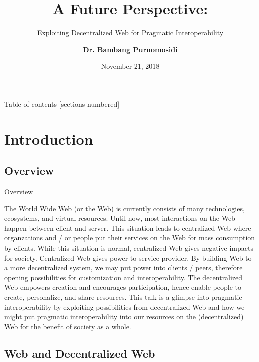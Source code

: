 \documentclass[10pt]{beamer}
\title{A Future Perspective:}
\subtitle{Exploiting Decentralized Web for Pragmatic Interoperability}
\date{November 21, 2018}
\author{\textbf{Dr. Bambang Purnomosidi}}
\institute{Informatics Engineering Department\\STMIK AKAKOM}
\begin{document}
\maketitle

\begin{frame}[allowframebreaks]{Table of contents}
  [sections numbered]
  \tableofcontents
\end{frame}

\section{Introduction}

  \subsection{Overview}

    \begin{frame}[fragile]{Overview}

  The World Wide Web (or the Web) is currently consists of many technologies, ecosystems, and virtual resources. Until now, most interactions on the Web happen between client and server. This situation leads to centralized Web where organzations and / or people put their services on the Web for mass consumption by clients. While this situation is normal, centralized Web gives negative impacts for society. Centralized Web gives power to service provider. By building Web to a more decentralized system, we may put power into clients / peers, therefore opening possibilities for customization and interoperability. The decentralized Web empowers creation and encourages participation, hence enable people to create, personalize, and share resources. This talk is a glimpse into pragmatic interoperability by exploiting possibilities from decentralized Web and how we might put pragmatic interoperability into our resources on the (decentralized) Web for the benefit of society as a whole.

    \end{frame}

  \subsection{Web and Decentralized Web}
\end{document}

